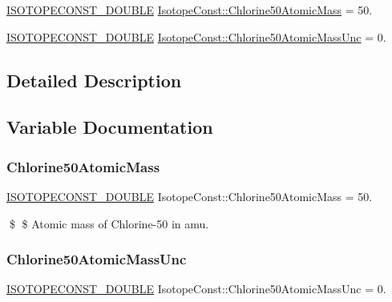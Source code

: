 \begin{DoxyCompactItemize}
\item 
\mbox{\hyperlink{group___isotope_const-_macros_ga8f45a7272ce02c0b4c65c44636ed719a}{I\+S\+O\+T\+O\+P\+E\+C\+O\+N\+S\+T\+\_\+\+D\+O\+U\+B\+LE}} \mbox{\hyperlink{group___isotope_const-_chlorine-_cl50_ga34722e01ab68ae1452986ebf0d9e90b1}{Isotope\+Const\+::\+Chlorine50\+Atomic\+Mass}} = 50.
\item 
\mbox{\hyperlink{group___isotope_const-_macros_ga8f45a7272ce02c0b4c65c44636ed719a}{I\+S\+O\+T\+O\+P\+E\+C\+O\+N\+S\+T\+\_\+\+D\+O\+U\+B\+LE}} \mbox{\hyperlink{group___isotope_const-_chlorine-_cl50_ga84c2c9e8055005ee91ba674e8f4e70b8}{Isotope\+Const\+::\+Chlorine50\+Atomic\+Mass\+Unc}} = 0.
\end{DoxyCompactItemize}


\subsection{Detailed Description}


\subsection{Variable Documentation}
\mbox{\label{group___isotope_const-_chlorine-_cl50_ga34722e01ab68ae1452986ebf0d9e90b1}} 
\subsubsection{\texorpdfstring{Chlorine50\+Atomic\+Mass}{Chlorine50AtomicMass}}
{\footnotesize\ttfamily \mbox{\hyperlink{group___isotope_const-_macros_ga8f45a7272ce02c0b4c65c44636ed719a}{I\+S\+O\+T\+O\+P\+E\+C\+O\+N\+S\+T\+\_\+\+D\+O\+U\+B\+LE}} Isotope\+Const\+::\+Chlorine50\+Atomic\+Mass = 50.}

\$ \$ Atomic mass of Chlorine-\/50 in amu. \mbox{\label{group___isotope_const-_chlorine-_cl50_ga84c2c9e8055005ee91ba674e8f4e70b8}} 
\subsubsection{\texorpdfstring{Chlorine50\+Atomic\+Mass\+Unc}{Chlorine50AtomicMassUnc}}
{\footnotesize\ttfamily \mbox{\hyperlink{group___isotope_const-_macros_ga8f45a7272ce02c0b4c65c44636ed719a}{I\+S\+O\+T\+O\+P\+E\+C\+O\+N\+S\+T\+\_\+\+D\+O\+U\+B\+LE}} Isotope\+Const\+::\+Chlorine50\+Atomic\+Mass\+Unc = 0.}

